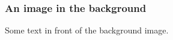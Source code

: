 \begin{frame}
    \frametitle{An image in the background}
    \centering
    Some text in front of the background image.
\end{frame}
